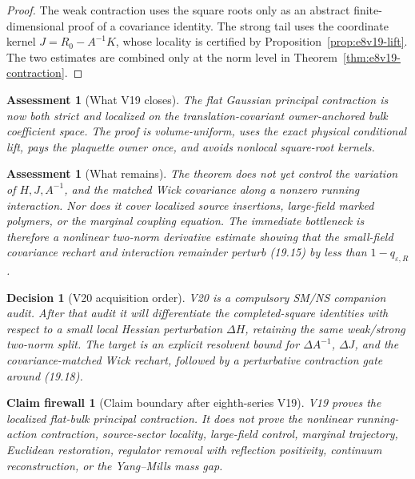 \documentclass[11pt,oneside]{book}
\newtheorem{assessment}[theorem]{Assessment}
\newtheorem{firewall}[theorem]{Claim firewall}
\newtheorem{decision}[theorem]{Decision}
\theoremstyle{definition}
\theoremstyle{remark}
\begin{document}
\begin{proof}
The weak contraction uses the square roots only as an abstract
finite-dimensional proof of a covariance identity.  The strong tail
uses the coordinate kernel \(J=R_0-A^{-1}K\), whose locality is
certified by Proposition~\ref{prop:e8v19-lift}.  The two estimates are
combined only at the norm level in
Theorem~\ref{thm:e8v19-contraction}.
\end{proof}

\begin{assessment}[What V19 closes]
\label{ass:e8v19-closes}
The flat Gaussian principal contraction is now both strict and
localized on the translation-covariant owner-anchored bulk
coefficient space.  The proof is volume-uniform, uses the exact
physical conditional lift, pays the plaquette owner once, and avoids
nonlocal square-root kernels.
\end{assessment}

\begin{assessment}[What remains]
\label{ass:e8v19-remains}
The theorem does not yet control the variation of \(H,J,A^{-1}\), and
the matched Wick covariance along a nonzero running interaction.
Nor does it cover localized source insertions, large-field marked
polymers, or the marginal coupling equation.  The immediate
bottleneck is therefore a nonlinear two-norm derivative estimate
showing that the small-field covariance rechart and interaction
remainder perturb (19.15) by less than
\(1-q_{\varepsilon,R}\).
\end{assessment}

\begin{decision}[V20 acquisition order]
\label{dec:e8v19-v20}
V20 is a compulsory SM/NS companion audit.  After that audit it will
differentiate the completed-square identities with respect to a
small local Hessian perturbation \(\Delta H\), retaining the same
weak/strong two-norm split.  The target is an explicit resolvent
bound for \(\Delta A^{-1}\), \(\Delta J\), and the covariance-matched
Wick rechart, followed by a perturbative contraction gate around
(19.18).
\end{decision}

\begin{firewall}[Claim boundary after eighth-series V19]
\label{fire:e8v19-claim}
V19 proves the localized flat-bulk principal contraction.  It does
not prove the nonlinear running-action contraction, source-sector
locality, large-field control, marginal trajectory, Euclidean
restoration, regulator removal with reflection positivity,
continuum reconstruction, or the Yang--Mills mass gap.
\end{firewall}
\end{document}

